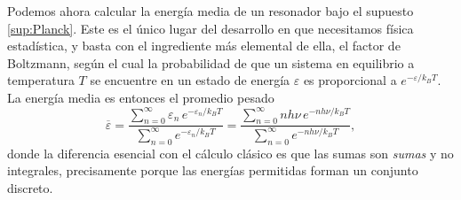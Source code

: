             Podemos ahora calcular la energía media de un resonador bajo el supuesto \ref{sup:Planck}. Este es el único lugar del desarrollo en que necesitamos física estadística, y basta con el ingrediente más elemental de ella, el factor de Boltzmann, según el cual la probabilidad de que un sistema en equilibrio a temperatura $T$ se encuentre en un estado de energía $\varepsilon$ es proporcional a $e^{-\varepsilon/k_{B}T}$. La energía media es entonces el promedio pesado
            \begin{equation}\label{eq:MediaPlanck1}
                \overline{\varepsilon} = \frac{\displaystyle\sum_{n=0}^{\infty}\varepsilon_{n}\,e^{-\varepsilon_{n}/k_{B}T}}{\displaystyle\sum_{n=0}^{\infty}e^{-\varepsilon_{n}/k_{B}T}}
                = \frac{\displaystyle\sum_{n=0}^{\infty}n h\nu\,e^{-nh\nu/k_{B}T}}{\displaystyle\sum_{n=0}^{\infty}e^{-nh\nu/k_{B}T}} ,
            \end{equation}
            donde la diferencia esencial con el cálculo clásico es que las sumas son \textit{sumas} y no integrales, precisamente porque las energías permitidas forman un conjunto discreto.

